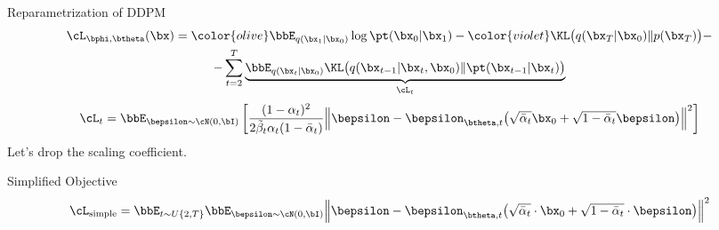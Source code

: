 \documentclass{beamer}
\begin{document}
\begin{frame}{Reparametrization of DDPM}
    \begin{multline*}
        \cL_{\bphi, \btheta}(\bx) =  {\color{olive}\bbE_{q(\bx_1 | \bx_0)} \log \pt(\bx_0 | \bx_1)} - {\color{violet}\KL\bigl(q(\bx_T | \bx_0) \| p(\bx_T)\bigr)} - \\
        - \sum_{t=2}^T \underbrace{ \bbE_{q(\bx_t | \bx_0)} \KL \bigl(q(\bx_{t-1} | \bx_t, \bx_0) \| \pt(\bx_{t-1} | \bx_t)\bigr)}_{\cL_t}
    \end{multline*}
    \eqpause
    \vspace{-0.3cm}
    \[
        \cL_t  = \bbE_{\bepsilon \sim \cN(0, \bI)} \left[ \frac{(1 - \alpha_t)^2}{2\tilde{\beta}_t \alpha_t (1 - \bar{\alpha}_t)} \Bigl\| \bepsilon - \bepsilon_{\btheta, t}\bigl( \sqrt{\bar{\alpha}_t} \bx_0 + \sqrt{1 - \bar{\alpha}_t} \bepsilon\bigr) \Bigr\|^2 \right]
    \]
    \eqpause
    Let's drop the scaling coefficient.
    \begin{block}{Simplified Objective}
        \vspace{-0.3cm}
        \[
             \cL_{\text{simple}} = \bbE_{t \sim U\{2, T\}} \bbE_{\bepsilon \sim \cN(0, \bI)} \Bigl\| \bepsilon - \bepsilon_{\btheta, t}\bigl( \sqrt{\bar{\alpha}_t} \cdot \bx_0 + \sqrt{1 - \bar{\alpha}_t} \cdot \bepsilon\bigr) \Bigr\|^2 
        \]
    \end{block}
\end{frame}
\end{document}
